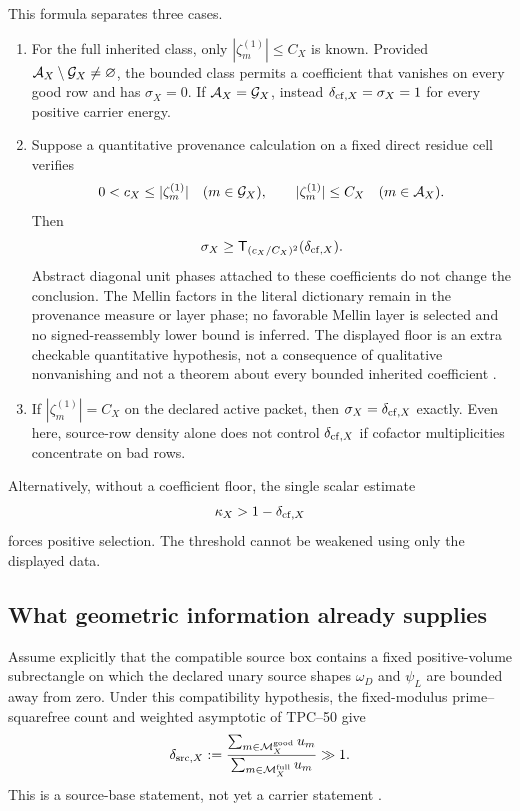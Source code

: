 This formula separates three cases.

\begin{enumerate}[label=\textup{(\alph*)},leftmargin=2.6em]
 \item For the full inherited class, only
       \(|\zeta_m^{(1)}|\le C_X\) is known.  Provided
       \(\mathcal A_X\setminus\mathcal G_X\ne\varnothing\), the bounded class permits a
       coefficient that vanishes on every good row and has
       \(\sigma_X=0\).  If \(\mathcal A_X=\mathcal G_X\), instead
       \(\delta_{{\rm cf},X}=\sigma_X=1\) for every positive carrier
       energy.
 \item Suppose a quantitative provenance calculation on a fixed direct
       residue cell verifies
       \[
        0<c_X\le|\zeta_m^{(1)}|\quad(m\in\mathcal G_X),
        \qquad |\zeta_m^{(1)}|\le C_X\quad(m\in\mathcal A_X).
       \]
       Then
       \[
       \sigma_X\ge
       \mathsf T_{(c_X/C_X)^2}(\delta_{{\rm cf},X}).
       \]
       Abstract diagonal unit phases attached to these coefficients do not
       change the conclusion.  The Mellin factors in the literal
       dictionary remain in the provenance measure or layer phase; no
       favorable Mellin layer is selected and no signed-reassembly lower
       bound is inferred.  The displayed floor is an extra checkable
       quantitative hypothesis, not a consequence of qualitative
       nonvanishing and not a theorem about every bounded inherited
       coefficient \citep{WangTPC25,WangTPC50}.
 \item If \(|\zeta_m^{(1)}|=C_X\) on the declared active packet, then
       \(\sigma_X=\delta_{{\rm cf},X}\) exactly.  Even here, source-row
       density alone does not control \(\delta_{{\rm cf},X}\) if
       cofactor multiplicities concentrate on bad rows.
\end{enumerate}

Alternatively, without a coefficient floor, the single scalar estimate
\begin{equation}
 \kappa_X>1-\delta_{{\rm cf},X}
 \label{eq:tpc54-physical-saturation-route}
\end{equation}
forces positive selection.  The threshold cannot be weakened using only
the displayed data.

\subsection{What geometric information already supplies}

Assume explicitly that the compatible source box contains a fixed
positive-volume subrectangle on which the declared unary source shapes
\(\omega_D\) and \(\psi_L\) are bounded away from zero.  Under this
compatibility hypothesis, the fixed-modulus prime--squarefree count and
weighted asymptotic of TPC--50 give
\begin{equation}
 \delta_{{\rm src},X}
 :=\frac{\sum_{m\in\mathcal M_X^{\rm good}}u_m}
         {\sum_{m\in\mathcal M_X^{\rm full}}u_m}
 \gg1.
 \label{eq:tpc54-source-fraction}
\end{equation}
This is a source-base statement, not yet a carrier statement
\citep{WangTPC50,WangTPC53}.

